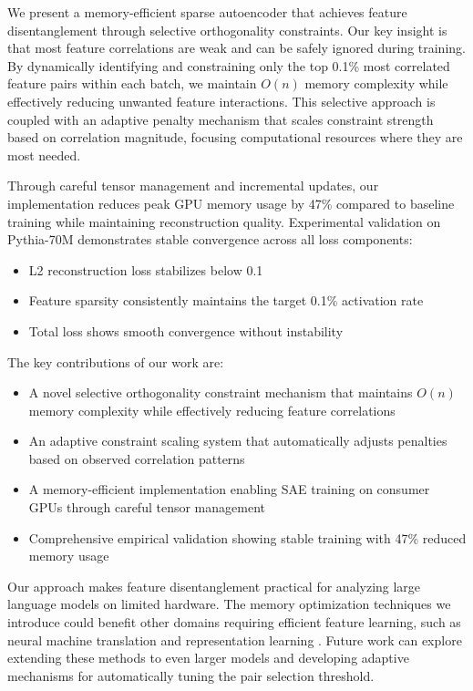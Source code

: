 \documentclass{article} %
\begin{document}
We present a memory-efficient sparse autoencoder that achieves feature disentanglement through selective orthogonality constraints. Our key insight is that most feature correlations are weak and can be safely ignored during training. By dynamically identifying and constraining only the top 0.1\% most correlated feature pairs within each batch, we maintain $O(n)$ memory complexity while effectively reducing unwanted feature interactions. This selective approach is coupled with an adaptive penalty mechanism that scales constraint strength based on correlation magnitude, focusing computational resources where they are most needed.

Through careful tensor management and incremental updates, our implementation reduces peak GPU memory usage by 47\% compared to baseline training while maintaining reconstruction quality. Experimental validation on Pythia-70M demonstrates stable convergence across all loss components:
\begin{itemize}
    \item L2 reconstruction loss stabilizes below 0.1
    \item Feature sparsity consistently maintains the target 0.1\% activation rate
    \item Total loss shows smooth convergence without instability
\end{itemize}

The key contributions of our work are:
\begin{itemize}
    \item A novel selective orthogonality constraint mechanism that maintains $O(n)$ memory complexity while effectively reducing feature correlations
    \item An adaptive constraint scaling system that automatically adjusts penalties based on observed correlation patterns
    \item A memory-efficient implementation enabling SAE training on consumer GPUs through careful tensor management
    \item Comprehensive empirical validation showing stable training with 47\% reduced memory usage
\end{itemize}

Our approach makes feature disentanglement practical for analyzing large language models on limited hardware. The memory optimization techniques we introduce could benefit other domains requiring efficient feature learning, such as neural machine translation \cite{bahdanau2014neural} and representation learning \cite{goodfellow2016deep}. Future work can explore extending these methods to even larger models and developing adaptive mechanisms for automatically tuning the pair selection threshold.
\end{document}
